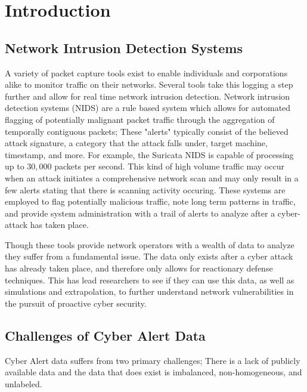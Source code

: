 %
%
%


\chapter{Introduction}

\section{Network Intrusion Detection Systems}
A variety of packet capture tools exist to enable individuals and corporations alike to monitor traffic on their networks. Several tools take this logging a step further and allow for real time network intrusion detection. Network intrusion detection systems (NIDS) are a rule based system which allows for automated flagging of potentially malignant packet traffic through the aggregation of temporally contiguous packets;  These "alerts" typically consist of the believed attack signature, a category that the attack falls under, target machine, timestamp, and more.   For example, the Suricata NIDS is capable of processing up to $30,000$ packets per second. This kind of high volume traffic may occur when an attack initiates a comprehensive network scan and may only result in a few alerts stating that there is scanning activity occuring. These systems are employed to flag potentially malicious traffic, note long term patterns in traffic, and provide system administration with a trail of alerts to analyze after a cyber-attack has taken place. 

Though these tools provide network operators with a wealth of data to analyze they suffer from a fundamental issue. The data only exists after a cyber attack has already taken place, and therefore only allows for reactionary defense techniques. This has lead researchers to see if they can use this data, as well as simulations and extrapolation, to further understand network vulnerabilities in the pursuit of proactive cyber security. 

\section{Challenges of Cyber Alert Data}
Cyber Alert data suffers from two primary challenges; There is a lack of publicly available data and the data that does exist is imbalanced, non-homogeneous, and unlabeled. 

